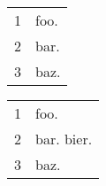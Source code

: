 \documentclass[10pt,a4paper]{article}
\begin{document}
\begin{tabular}{lp{}}
1 & foo. \\
2 & bar. \\
3 & baz.
\end{tabular}


\begin{tabular}{lp{}}
1 & foo. \\
2 & bar. \newline bier. \\
3 & baz.
\end{tabular}
\end{document}

